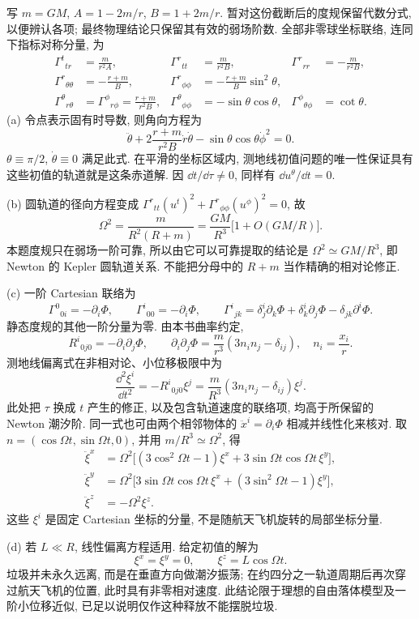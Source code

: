 \begin{solution}
写 $m=GM$, $A=1-2m/r$, $B=1+2m/r$. 暂对这份截断后的度规保留代数分式, 以便辨认各项; 最终物理结论只保留其有效的弱场阶数. 全部非零球坐标联络, 连同下指标对称分量, 为
\begin{align*}
\Gamma^t{}_{tr}&=\frac{m}{r^2A}, &
\Gamma^r{}_{tt}&=\frac{m}{r^2B}, &
\Gamma^r{}_{rr}&=-\frac{m}{r^2B},\\
\Gamma^r{}_{\theta\theta}&=-\frac{r+m}{B}, &
\Gamma^r{}_{\phi\phi}&=-\frac{r+m}{B}\sin^2\theta,\\
\Gamma^\theta{}_{r\theta}&=\Gamma^\phi{}_{r\phi}=\frac{r+m}{r^2B}, &
\Gamma^\theta{}_{\phi\phi}&=-\sin\theta\cos\theta, &
\Gamma^\phi{}_{\theta\phi}&=\cot\theta.
\end{align*}
(a) 令点表示固有时导数, 则角向方程为
\[
\ddot\theta+2\frac{r+m}{r^2B}\dot r\dot\theta
-\sin\theta\cos\theta\dot\phi^2=0.
\]
$\theta\equiv\pi/2$, $\dot\theta\equiv0$ 满足此式. 在平滑的坐标区域内, 测地线初值问题的唯一性保证具有这些初值的轨道就是这条赤道解. 因 $\dd t/\dd\tau\ne0$, 同样有 $\dd u^\theta/\dd t=0$.

(b) 圆轨道的径向方程变成 $\Gamma^r{}_{tt}(u^t)^2+\Gamma^r{}_{\phi\phi}(u^\phi)^2=0$, 故
\[
\Omega^2=\frac{m}{R^2(R+m)}
=\frac{GM}{R^3}\bigl[1+O(GM/R)\bigr].
\]
本题度规只在弱场一阶可靠, 所以由它可以可靠提取的结论是 $\Omega^2\simeq GM/R^3$, 即 Newton 的 Kepler 圆轨道关系. 不能把分母中的 $R+m$ 当作精确的相对论修正.

(c) 一阶 Cartesian 联络为
\[
\Gamma^0{}_{0i}=-\partial_i\Phi,\qquad
\Gamma^i{}_{00}=-\partial_i\Phi,\qquad
\Gamma^i{}_{jk}=\delta^i_j\partial_k\Phi+
\delta^i_k\partial_j\Phi-\delta_{jk}\partial^i\Phi.
\]
静态度规的其他一阶分量为零. 由本书曲率约定,
\[
R^i{}_{0j0}=-\partial_i\partial_j\Phi,
\qquad \partial_i\partial_j\Phi
=\frac{m}{r^3}(3n_in_j-\delta_{ij}),\quad n_i=\frac{x_i}r.
\]
测地线偏离式在非相对论、小位移极限中为
\[
\frac{\dd^2\xi^i}{\dd t^2}
=-R^i{}_{0j0}\xi^j
=\frac{m}{R^3}(3n_in_j-\delta_{ij})\xi^j.
\]
此处把 $\tau$ 换成 $t$ 产生的修正, 以及包含轨道速度的联络项, 均高于所保留的 Newton 潮汐阶. 同一式也可由两个相邻物体的 $\ddot x^i=\partial_i\Phi$ 相减并线性化来核对. 取 $n=(\cos\Omega t,\sin\Omega t,0)$, 并用 $m/R^3\simeq\Omega^2$, 得
\begin{align*}
\ddot\xi^x&=\Omega^2\bigl[(3\cos^2\Omega t-1)\xi^x
+3\sin\Omega t\cos\Omega t\,\xi^y\bigr],\\
\ddot\xi^y&=\Omega^2\bigl[3\sin\Omega t\cos\Omega t\,\xi^x
+(3\sin^2\Omega t-1)\xi^y\bigr],\\
\ddot\xi^z&=-\Omega^2\xi^z.
\end{align*}
这些 $\xi^i$ 是固定 Cartesian 坐标的分量, 不是随航天飞机旋转的局部坐标分量.

(d) 若 $L\ll R$, 线性偏离方程适用. 给定初值的解为
\[
\xi^x=\xi^y=0,\qquad \xi^z=L\cos\Omega t.
\]
垃圾并未永久远离, 而是在垂直方向做潮汐振荡; 在约四分之一轨道周期后再次穿过航天飞机的位置, 此时具有非零相对速度. 此结论限于理想的自由落体模型及一阶小位移近似, 已足以说明仅作这种释放不能摆脱垃圾.
\end{solution}

